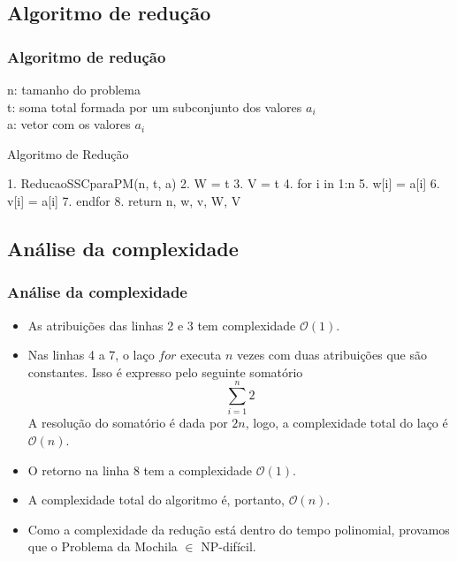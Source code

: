\documentclass{beamer}
\begin{document}
\subsection{Algoritmo de redução}
\begin{frame}[fragile]
\frametitle{Algoritmo de redução}
    n: tamanho do problema \\
    t: soma total formada por um subconjunto dos valores $a_{i}$ \\
    a: vetor com os valores $a_{i}$ \\
    \begin{block}{Algoritmo de Redução}
        \begin{semiverbatim}
        1. ReducaoSSCparaPM(n, t, a)
        2.    W = t
        3.    V = t
        4.    for i in 1:n
        5.        w[i] = a[i]
        6.        v[i] = a[i]
        7.    endfor
        8.    return n, w, v, W, V
        \end{semiverbatim}
    \end{block}
\end{frame}


\subsection{Análise da complexidade}
\begin{frame}
\frametitle{Análise da complexidade}
    \begin{itemize}
        \item As atribuições das linhas 2 e 3 tem complexidade $\mathcal{O}(1)$.

        \item Nas linhas 4 a 7, o laço $for$ executa $n$ vezes com duas atribuições que são constantes. Isso é expresso pelo seguinte somatório
         \begin{equation*}
            \sum_{i=1}^{n} 2
         \end{equation*}
        A resolução do somatório é dada por $2n$, logo, a complexidade total do laço é $\mathcal{O}(n)$.
        \item O retorno na linha 8 tem a complexidade $\mathcal{O}(1)$.
        \item A complexidade total do algoritmo é, portanto, $\mathcal{O}(n)$.
        \item Como a complexidade da redução está dentro do tempo polinomial, provamos que o Problema da Mochila $\in$ NP-difícil.
    \end{itemize}
\end{frame}
\end{document}

